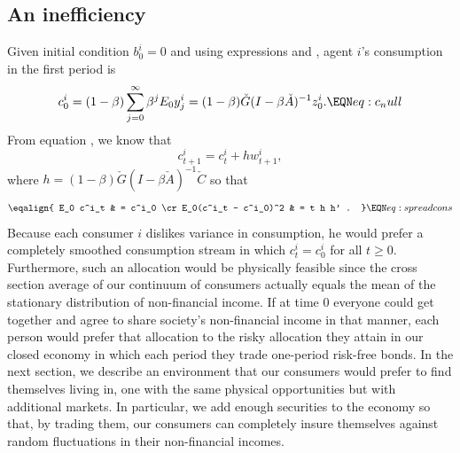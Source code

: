 


\subsection{An inefficiency}
Given initial condition $b^i_0 = 0$ and using expressions
 and , agent $i$'s
consumption in the first period is
$$ c^i_0 = (1-\beta) \sum_{j=0}^\infty \beta^j E_0 y^i_{j} 
         = (1-\beta) \check G(I-\beta \check A)^{-1} z^i_0.
                                         \EQN eq:c_null $$
 From equation , we know that  
$$ c^i_{t+1} = c^i_t + h w^i_{t+1} , $$
where $h = (1-\beta) \check G (I - \beta \check A)^{-1} \check C $
so that
$$ \eqalign{ E_0 c^i_t & = c^i_0 \cr
              E_0(c^i_t  - c^i_0)^2 & = t h h' . } \EQN eq:spreadcons $$
Because each consumer $i$ dislikes variance in consumption, he would prefer a completely smoothed   consumption stream  in which $c^i_t = c^i_0$ for all $t \geq 0$. Furthermore, such an allocation 
would be physically feasible since the cross section average of our continuum of consumers actually equals the mean of the
stationary distribution of non-financial income.
If at time $0$ everyone could get together and agree to
share society's non-financial income in that manner, each 
person would prefer that allocation to the 
risky allocation they attain in our closed economy in which each period they trade one-period risk-free bonds.   In the next section, we describe an environment that our consumers would prefer to find themselves living in, one  with the same physical opportunities but with additional markets.  In particular, we add enough securities to the economy so that, by trading them, our consumers can  completely insure themselves against random 
fluctuations in their non-financial incomes. 






%
%
